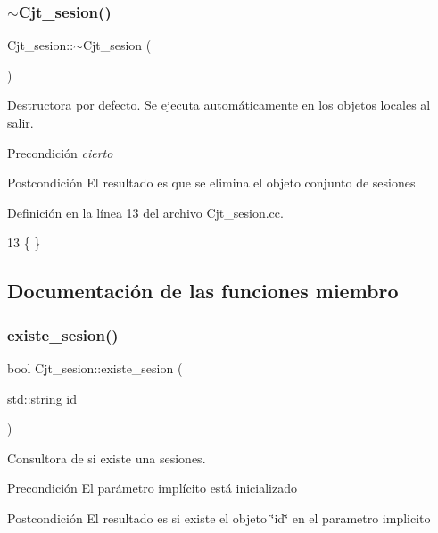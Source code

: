 \subsubsection{\texorpdfstring{$\sim$\+Cjt\+\_\+sesion()}{~Cjt\_sesion()}}
{\footnotesize\ttfamily Cjt\+\_\+sesion\+::$\sim$\+Cjt\+\_\+sesion (\begin{DoxyParamCaption}{ }\end{DoxyParamCaption})}



Destructora por defecto. Se ejecuta automáticamente en los objetos locales al salir. 

\begin{DoxyPrecond}{Precondición}
{\itshape cierto} 
\end{DoxyPrecond}
\begin{DoxyPostcond}{Postcondición}
El resultado es que se elimina el objeto conjunto de sesiones 
\end{DoxyPostcond}


Definición en la línea 13 del archivo Cjt\+\_\+sesion.\+cc.


\begin{DoxyCode}
13 \{ \}
\end{DoxyCode}


\subsection{Documentación de las funciones miembro}
\mbox{\label{class_cjt__sesion_a405ed3806e378d1a415588e640584bbd}} 
\subsubsection{\texorpdfstring{existe\+\_\+sesion()}{existe\_sesion()}}
{\footnotesize\ttfamily bool Cjt\+\_\+sesion\+::existe\+\_\+sesion (\begin{DoxyParamCaption}\item[{std\+::string}]{id }\end{DoxyParamCaption})\hspace{0.3cm}{\ttfamily [private]}}



Consultora de si existe una sesiones. 

\begin{DoxyPrecond}{Precondición}
El parámetro implícito está inicializado 
\end{DoxyPrecond}
\begin{DoxyPostcond}{Postcondición}
El resultado es si existe el objeto \char`\"{}id\char`\"{} en el parametro implicito 
\end{DoxyPostcond}


